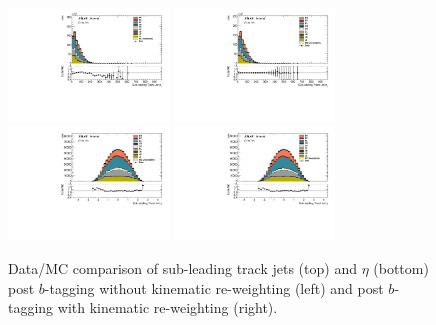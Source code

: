 \begin{figure}[htbp]
  \centering
\includegraphics[width=0.38\textwidth]{figures/gbb/SubLeadTrkJet_pT_PreReweight.pdf}
 \includegraphics[width=0.38\textwidth]{figures/gbb/SubLeadTrkJet_pT_Reweight.pdf}
\includegraphics[width=0.38\textwidth]{figures/gbb/SubLeadTrkJet_eta_PreReweight.pdf}
 \includegraphics[width=0.38\textwidth]{figures/gbb/SubLeadTrkJet_eta_Reweight.pdf}
\caption{Data/MC comparison of sub-leading track jets \pt (top) and $\eta$ (bottom) post $b$-tagging without kinematic re-weighting (left) and post $b$-tagging with kinematic re-weighting (right).}%
  \label{fig:gbb-pT_subtrkjets}
\end{figure}
